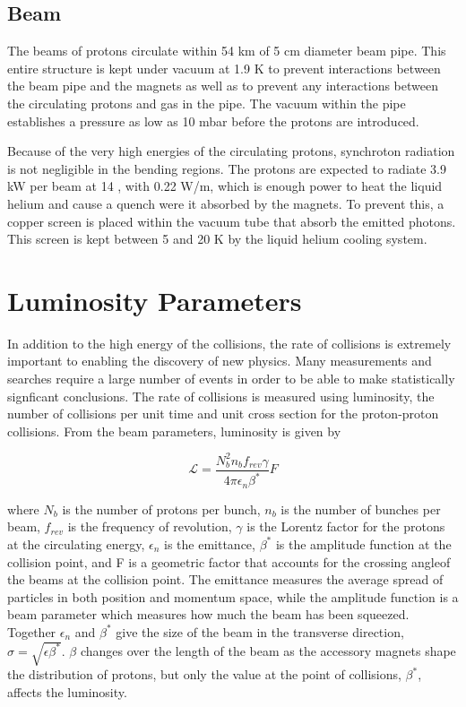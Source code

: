 \subsection{Beam}

The beams of protons circulate within 54 km of 5 cm diameter beam pipe.
This entire structure is kept under vacuum at 1.9 K to prevent interactions between the beam pipe and the magnets as well as to prevent any interactions between the circulating protons and gas in the pipe. 
The vacuum within the pipe establishes a pressure as low as 10 mbar before the protons are introduced.

Because of the very high energies of the circulating protons, synchroton radiation is not negligible in the bending regions.
The protons are expected to radiate 3.9 kW per beam at 14 \TeV, with 0.22 W/m, which is enough power to heat the liquid helium and cause a quench were it absorbed by the magnets.
To prevent this, a copper screen is placed within the vacuum tube that absorb the emitted photons.
This screen is kept between 5 and 20 K by the liquid helium cooling system.


\section{Luminosity Parameters}

In addition to the high energy of the collisions, the rate of collisions is extremely important to enabling the discovery of new physics.
Many measurements and searches require a large number of events in order to be able to make statistically signficant conclusions.
The rate of collisions is measured using luminosity, the number of collisions per unit time and unit cross section for the proton-proton collisions.
From the beam parameters, luminosity is given by 

\[\label{eq:luminosity} \mathcal{L} = \frac{N_b^2 n_b f_{rev} \gamma}{4\pi \epsilon_n \beta^*} F \]

where $N_b$ is the number of protons per bunch, $n_b$ is the number of bunches per beam, $f_{rev}$ is the frequency of revolution, $\gamma$ is the Lorentz factor for the protons at the circulating energy, $\epsilon_n$ is the emittance, $\beta^*$ is the amplitude function at the collision point, and F is a geometric factor that accounts for the crossing angleof the beams at the collision point. 
The emittance measures the average spread of particles in both position and momentum space, while the amplitude function is a beam parameter which measures how much the beam has been squeezed. 
Together $\epsilon_n$ and $\beta^*$ give the size of the beam in the transverse direction, $\sigma = \sqrt{\epsilon\beta^*}$. 
$\beta$ changes over the length of the beam as the accessory magnets shape the distribution of protons, but only the value at the point of collisions, $\beta^*$, affects the luminosity.

